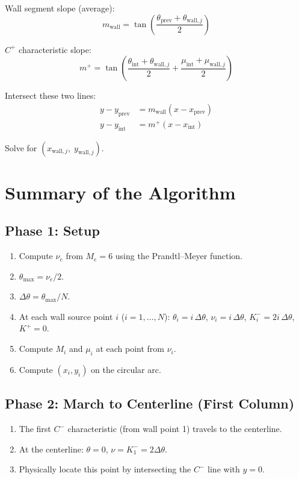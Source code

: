 \documentclass[11pt]{article}
\begin{document}
Wall segment slope (average):
\begin{equation}
    m_{\mathrm{wall}} = \tan\!\left(\frac{\theta_{\mathrm{prev}} + \theta_{\mathrm{wall},j}}{2}\right)
\end{equation}

$C^+$ characteristic slope:
\begin{equation}
    m^+ = \tan\!\left(\frac{\theta_{\mathrm{int}} + \theta_{\mathrm{wall},j}}{2} + \frac{\mu_{\mathrm{int}} + \mu_{\mathrm{wall},j}}{2}\right)
\end{equation}

Intersect these two lines:
\begin{align}
    y - y_{\mathrm{prev}} &= m_{\mathrm{wall}}(x - x_{\mathrm{prev}}) \\
    y - y_{\mathrm{int}} &= m^+(x - x_{\mathrm{int}})
\end{align}

Solve for $(x_{\mathrm{wall},j},\; y_{\mathrm{wall},j})$.

\section{Summary of the Algorithm}

\subsection{Phase 1: Setup}
\begin{enumerate}
    \item Compute $\nu_e$ from $M_e = 6$ using the Prandtl--Meyer function.
    \item $\theta_{\max} = \nu_e / 2$.
    \item $\Delta\theta = \theta_{\max} / N$.
    \item At each wall source point $i$ ($i = 1, \ldots, N$): $\theta_i = i\,\Delta\theta$, $\nu_i = i\,\Delta\theta$, $K^-_i = 2i\,\Delta\theta$, $K^+ = 0$.
    \item Compute $M_i$ and $\mu_i$ at each point from $\nu_i$.
    \item Compute $(x_i, y_i)$ on the circular arc.
\end{enumerate}

\subsection{Phase 2: March to Centerline (First Column)}
\begin{enumerate}
    \item The first $C^-$ characteristic (from wall point 1) travels to the centerline.
    \item At the centerline: $\theta = 0$, $\nu = K^-_1 = 2\Delta\theta$.
    \item Physically locate this point by intersecting the $C^-$ line with $y = 0$.
\end{enumerate}
\end{document}
